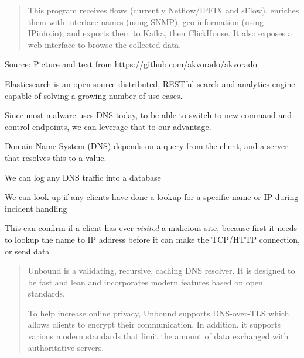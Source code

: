 \documentclass[Screen16to9,17pt]{foils}
\begin{document}


\begin{quote}
This program receives flows (currently Netflow/IPFIX and sFlow), enriches them with interface names (using SNMP), geo information (using IPinfo.io), and exports them to Kafka, then ClickHouse. It also exposes a web interface to browse the collected data.
\end{quote}
Source: Picture and text from \url{https://github.com/akvorado/akvorado}




Elasticsearch is an open source distributed, RESTful search and analytics engine capable of solving a growing number of use cases.



Since most malware uses DNS today, to be able to switch to new command and control endpoints, we can leverage that to our advantage.

Domain Name System (DNS) depends on a query from the client, and a server that resolves this to a value.

\begin{list2}
\item We can log any DNS traffic into a database
\item We can look up if any clients have done a lookup for a specific name or IP during incident handling
\item This can confirm if a client has ever \emph{visited} a malicious site, because first it needs to lookup the name to IP address before it can make the TCP/HTTP connection, or send data
\end{list2}




\begin{quote}
Unbound is a validating, recursive, caching DNS resolver. It is designed to be fast and lean and incorporates modern features based on open standards.

To help increase online privacy, Unbound supports DNS-over-TLS which allows clients to encrypt their communication. In addition, it supports various modern standards that limit the amount of data exchanged with authoritative servers.
\end{quote}
\end{document}
